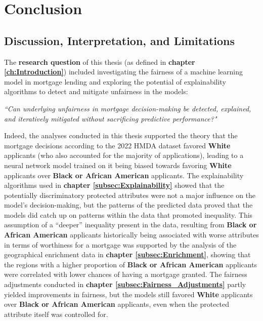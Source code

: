 \chapter{Conclusion}\label{ch:discussion}

\section{Discussion, Interpretation, and Limitations}\label{sec:discussion}


The \textbf{research question} of this thesis (as defined in \textbf{chapter \ref{ch:Introduction}}) included investigating the fairness of a machine learning model in mortgage lending and exploring the potential of explainability algorithms to detect and mitigate unfairness in the models:

\textit{“Can underlying unfairness in mortgage decision-making be detected, explained, and iteratively mitigated without sacrificing predictive performance?"} %


Indeed, the analyses conducted in this thesis supported the theory that the mortgage decisions according to the 2022 HMDA dataset favored \textbf{White} applicants (who also accounted for the majority of applications), leading to a neural network model trained on it being biased towards favoring \textbf{White} applicants over \textbf{Black or African American} applicants.
The explainability algorithms used in \textbf{chapter \ref{subsec:Explainability}} showed that the potentially discriminatory protected attributes were not a major influence on the model’s decision-making, but the patterns of the predicted data proved that the models did catch up on patterns within the data that promoted inequality.
This assumption of a “deeper” inequality present in the data, resulting from \textbf{Black or African American} applicants historically being associated with worse attributes in terms of worthiness for a mortgage was supported by the analysis of the geographical enrichment data in \textbf{chapter \ref{subsec:Enrichment}}, showing that the regions with a higher proportion of \textbf{Black or African American} applicants were correlated with lower chances of having a mortgage granted.
The fairness adjustments conducted in \textbf{chapter \ref{subsec:Fairness_Adjustments}} partly yielded improvements in fairness, but the models still favored \textbf{White} applicants over \textbf{Black or African American} applicants, even when the protected attribute itself was controlled for.

